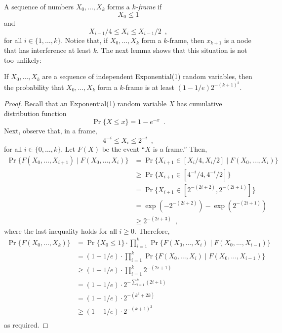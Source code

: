 \documentclass{patmorin}
\begin{document}
A sequence of numbers $X_0,\ldots,X_k$ forms a \emph{$k$-frame} if
\[
     X_0 \le 1
\]
and
\[
     X_{i-1}/4 \le X_i \le X_{i-1}/2 \enspace ,
\]
for all $i\in\{1,\ldots,k\}$.  Notice that, if $X_0,\ldots,X_k$ form a
$k$-frame, then $x_{k+1}$ is a node that has interference at least $k$.
The next lemma shows that this situation is not too unlikely:

\begin{lem}
If $X_0,\ldots,X_k$ are a sequence of independent Exponential(1) random
variables, then the probability that $X_0,\ldots,X_k$ form a $k$-frame
is at least $(1-1/e)2^{-(k+1)^2}$.
\end{lem}

\begin{proof}
Recall that an Exponential(1) random variable $X$ has cumulative
distribution function
\[
   \Pr\{X \le x\} = 1-e^{-x} \enspace .
\]
Next, observe that, in a frame,
\[
                 4^{-i} \le X_i \le 2^{-i}  \enspace ,
\]
for all $i\in\{0,\ldots,k\}$.  Let $F(X)$ be the event ``$X$ is a frame.''
Then,
\begin{align*}
     \Pr\{F(X_0,\ldots,X_{i+1}) \mid F(X_0,\ldots,X_{i})\} 
        & = \Pr\{X_{i+1} \in [X_{i}/4,X_{i}/2] \mid F(X_0,\ldots,X_{i})\} \\
        & \ge \Pr\{X_{i+1} \in [4^{-i}/4,4^{-i}/2]\} \\
        & = \Pr\{X_{i+1} \in [2^{-(2i+2)},2^{-(2i+1)}]\} \\
        & = \exp(-2^{-(2i+2)}) - \exp(2^{-(2i+1)}) \\
        & \ge 2^{-(2i+3)} \enspace ,
\end{align*}
where the last inequality holds for all $i\ge 0$.  Therefore,
\begin{align*}
     \Pr\{F(X_0,\ldots,X_{k})\}
   & = \Pr\{X_0\le 1\}
         \cdot\prod_{i=1}^k \Pr\{F(X_0,\ldots,X_{i})
                                 \mid F(X_0,\ldots,X_{i-1})\} \\
   & = (1-1/e)
         \cdot\prod_{i=1}^k \Pr\{F(X_0,\ldots,X_{i})
                                 \mid F(X_0,\ldots,X_{i-1})\} \\
   & \ge (1-1/e)\cdot\prod_{i=1}^k 2^{-(2i+1)} \\
   & = (1-1/e)\cdot2^{-\sum_{i=1}^k(2i+1)} \\
   & = (1-1/e)\cdot2^{-(k^2+2k)} \\
   & \ge (1-1/e)\cdot2^{-(k+1)^2} \\
\end{align*}
as required.
\end{proof}
\end{document}
